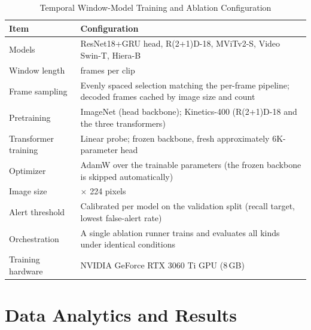 \documentclass[conference]{IEEEtran}
\begin{document}
\begin{table}[!t]
\centering
\caption{Temporal Window-Model Training and Ablation Configuration}
\label{tab:temporal-config}
\renewcommand{\arraystretch}{1.08}
\setlength{\tabcolsep}{3.5pt}

\begin{tabularx}{\columnwidth}{
    >{\raggedright\arraybackslash}p{2.25cm}
    >{\raggedright\arraybackslash}X
}
\toprule
\textbf{Item} & \textbf{Configuration} \\
\midrule

Models &
ResNet18+GRU head, R(2+1)D-18, MViTv2-S, Video Swin-T, Hiera-B \\

Window length &
16 frames per clip \\

Frame sampling &
Evenly spaced selection matching the per-frame pipeline; decoded frames
cached by image size and count \\

Pretraining &
ImageNet (head backbone); Kinetics-400 (R(2+1)D-18 and the three
transformers) \\

Transformer training &
Linear probe; frozen backbone, fresh approximately 6K-parameter head \\

Optimizer &
AdamW over the trainable parameters (the frozen backbone is skipped
automatically) \\

Image size &
224 $\times$ 224 pixels \\

Alert threshold &
Calibrated per model on the validation split (recall target, lowest
false-alert rate) \\

Orchestration &
A single ablation runner trains and evaluates all kinds under identical
conditions \\

Training hardware &
NVIDIA GeForce RTX 3060 Ti GPU (8\,GB) \\

\bottomrule
\end{tabularx}
\end{table}



\section{Data Analytics and Results}
\end{document}
